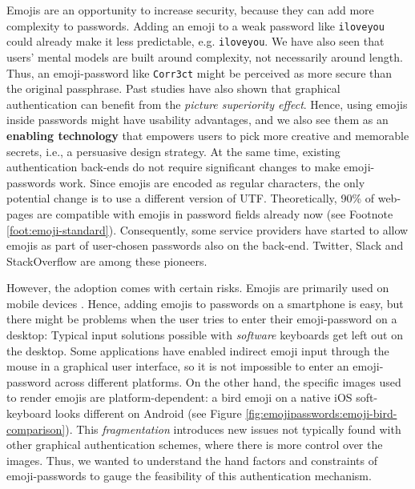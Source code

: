 Emojis are an opportunity to increase security, because they can add more complexity to passwords. Adding an emoji to a weak password like \texttt{iloveyou} could already make it less predictable, e.g. \texttt{iloveyou}. We have also seen that users' mental models are built around complexity, not necessarily around length. Thus, an emoji-password like \texttt{Corr3ct} might be perceived as more secure than the original passphrase. Past studies have also shown that graphical authentication can benefit from the \textit{picture superiority effect}. Hence, using emojis inside passwords might have usability advantages, and we also see them as an \textbf{enabling technology} that empowers users to pick more creative and memorable secrets, i.e., a persuasive design strategy. At the same time, existing authentication back-ends do not require significant changes to make emoji-passwords work. Since emojis are encoded as regular characters, the only potential change is to use a different version of UTF. Theoretically, 90\% of web-pages are compatible with emojis in password fields already now (see Footnote \ref{foot:emoji-standard}). Consequently, some service providers have started to allow emojis as part of user-chosen passwords also on the back-end. Twitter, Slack and StackOverflow are among these pioneers. 

However, the adoption comes with certain risks. Emojis are primarily used on mobile devices \cite{EmogiResearch2016}. Hence, adding emojis to passwords on a smartphone is easy, but there might be problems when the user tries to enter their emoji-password on a desktop: Typical input solutions possible with \textit{software} keyboards get left out on the desktop. Some applications have enabled indirect emoji input through the mouse in a graphical user interface, so it is not impossible to enter an emoji-password across different platforms. On the other hand, the specific images used to render emojis are platform-dependent: a bird emoji on a native iOS soft-keyboard looks different on Android (see Figure \ref{fig:emojipasswords:emoji-bird-comparison}). This \textit{fragmentation} introduces new issues not typically found with other graphical authentication schemes, where there is more control over the images. 
Thus, we wanted to understand the hand factors and constraints of emoji-passwords to gauge the feasibility of this authentication mechanism.

